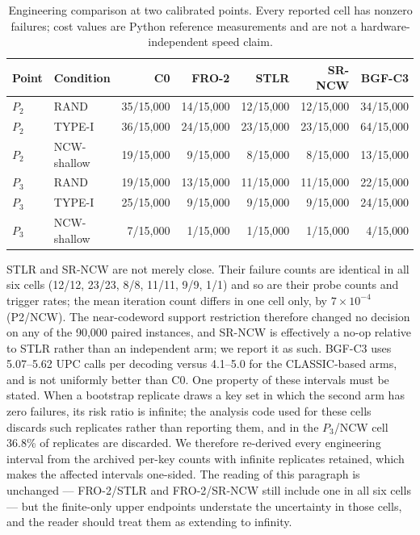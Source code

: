 \documentclass[lettersize,journal]{IEEEtran}
\begin{document}
\begin{table}[t]
\centering
\caption{Engineering comparison at two calibrated points. Every reported cell has nonzero failures; cost values are Python reference measurements and are not a hardware-independent speed claim.}
\label{tab:eng}
\footnotesize
\begin{tabular}{@{}llrrrrr@{}}
\toprule
Point & Condition & C0 & FRO-2 & STLR & SR-NCW & BGF-C3 \\
\midrule
$P_2$ & RAND        & 35/15{,}000 & 14/15{,}000 & 12/15{,}000 & 12/15{,}000 & 34/15{,}000 \\
$P_2$ & TYPE-I      & 36/15{,}000 & 24/15{,}000 & 23/15{,}000 & 23/15{,}000 & 64/15{,}000 \\
$P_2$ & NCW-shallow & 19/15{,}000 & 9/15{,}000  & 8/15{,}000  & 8/15{,}000  & 13/15{,}000 \\
$P_3$ & RAND        & 19/15{,}000 & 13/15{,}000 & 11/15{,}000 & 11/15{,}000 & 22/15{,}000 \\
$P_3$ & TYPE-I      & 25/15{,}000 & 9/15{,}000  & 9/15{,}000  & 9/15{,}000  & 24/15{,}000 \\
$P_3$ & NCW-shallow & 7/15{,}000  & 1/15{,}000  & 1/15{,}000  & 1/15{,}000  & 4/15{,}000 \\
\bottomrule
\end{tabular}
\end{table}

STLR and SR-NCW are not merely close. Their failure counts are identical in all six cells (12/12, 23/23, 8/8, 11/11, 9/9, 1/1) and so are their probe counts and trigger rates; the mean iteration count differs in one cell only, by $7\times10^{-4}$ (P2/NCW). The near-codeword support restriction therefore changed no decision on any of the 90{,}000 paired instances, and SR-NCW is effectively a no-op relative to STLR rather than an independent arm; we report it as such. BGF-C3 uses 5.07--5.62 UPC calls per decoding versus 4.1--5.0 for the CLASSIC-based arms, and is not uniformly better than C0. One property of these intervals must be stated. When a bootstrap replicate draws a key set in which the second arm has zero failures, its risk ratio is infinite; the analysis code used for these cells discards such replicates rather than reporting them, and in the $P_3$/NCW cell 36.8\% of replicates are discarded. We therefore re-derived every engineering interval from the archived per-key counts with infinite replicates retained, which makes the affected intervals one-sided. The reading of this paragraph is unchanged --- FRO-2/STLR and FRO-2/SR-NCW still include one in all six cells --- but the finite-only upper endpoints understate the uncertainty in those cells, and the reader should treat them as extending to infinity.
\end{document}
